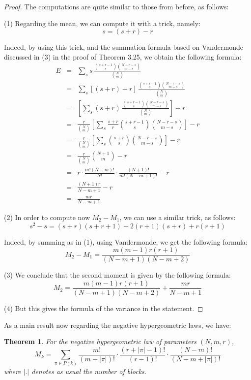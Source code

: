 \documentclass[12pt]{amsbook}
\newtheorem{theorem}{Theorem}[chapter]
\begin{document}
\begin{proof}
The computations are quite similar to those from before, as follows:

\medskip

(1) Regarding the mean, we can compute it with a trick, namely:
$$s=(s+r)-r$$

Indeed, by using this trick, and the summation formula based on Vandermonde discussed in (3) in the proof of Theorem 3.25, we obtain the following formula:
\begin{eqnarray*}
E
&=&\sum_ss\,\frac{\binom{s+r-1}{s}\binom{N-r-s}{m-s}}{\binom{N}{m}}\\
&=&\sum_s[(s+r)-r]\,\frac{\binom{s+r-1}{s}\binom{N-r-s}{m-s}}{\binom{N}{m}}\\
&=&\left[\sum_s(s+r)\,\frac{\binom{s+r-1}{s}\binom{N-r-s}{m-s}}{\binom{N}{m}}\right]-r\\
&=&\frac{r}{\binom{N}{m}}\left[\sum_s\frac{s+r}{r}\binom{s+r-1}{s}\binom{N-r-s}{m-s}\right]-r\\
&=&\frac{r}{\binom{N}{m}}\left[\sum_s\binom{s+r}{s}\binom{N-r-s}{m-s}\right]-r\\
&=&\frac{r}{\binom{N}{m}}\binom{N+1}{m}-r\\
&=&r\cdot\frac{m!(N-m)!}{N!}\cdot\frac{(N+1)!}{m!(N-m+1)!}-r\\
&=&\frac{(N+1)r}{N-m+1}-r\\
&=&\frac{mr}{N-m+1}
\end{eqnarray*}

(2) In order to compute now $M_2-M_1$, we can use a similar trick, as follows:
$$s^2-s=(s+r)(s+r+1)-2(r+1)(s+r)+r(r+1)$$

Indeed, by summing as in (1), using Vandermonde, we get the following formula:
$$M_2-M_1=\frac{m(m-1)r(r+1)}{(N-m+1)(N-m+2)}$$

(3) We conclude that the second moment is given by the following formula:
$$M_2=\frac{m(m-1)r(r+1)}{(N-m+1)(N-m+2)}+\frac{mr}{N-m+1}$$

(4) But this gives the formula of the variance in the statement.
\end{proof}

As a main result now regarding the negative hypergeometric laws, we have:


\begin{theorem}
For the negative hypergeometric law of parameters $(N,m,r)$,
$$M_k=\sum_{\pi\in P(k)}\frac{m!}{(m-|\pi|)!}\cdot\frac{(r+|\pi|-1)!}{(r-1)!}\cdot\frac{(N-m)!}{(N-m+|\pi|)!}$$
where $|.|$ denotes as usual the number of blocks.
\end{theorem}
\end{document}
